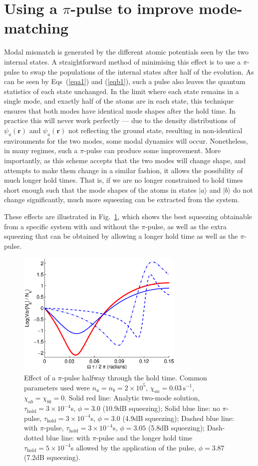 \documentclass{iopart}
\begin{document}
\section{Using a $\pi$-pulse to improve mode-matching} \label{sec:pipulse}
Modal mismatch is generated by the different atomic potentials seen by the two internal states.  A straightforward method of minimising this effect is to use a $\pi$-pulse to swap the populations of the internal states after half of the evolution. As can be seen by Eqs~(\ref{eqa1}) and (\ref{eqb1}), such a pulse also leaves the quantum statistics of each state unchanged. In the limit where each state remains in a single mode, and exactly half of the atoms are in each state, this technique ensures that both modes have identical mode shapes after the hold time. In practice this will never work perfectly --- due to the density distributions of $\psi_a(\mathbf{r})$ and $\psi_a(\mathbf{r})$ not reflecting the ground state, resulting in non-identical environments for the two modes, some modal dynamics will occur. Nonetheless, in many regimes, such a $\pi$-pulse can produce some improvement. More importantly, as this scheme accepts that the two modes will change shape, and attempts to make them change in a similar fashion, it allows the possibility of much longer hold times. That is, if we are no longer constrained to hold times short enough such that the mode shapes of the atoms in states $|a \rangle$ and $|b \rangle$ do not change significantly, much more squeezing can be extracted from the system.

These effects are illustrated in Fig.~\ref{piPulseFig}, which shows the best squeezing obtainable from a specific system with and without the $\pi$-pulse, as well as the extra squeezing that can be obtained by allowing a longer hold time as well as the $\pi$-pulse.
\begin{figure}
    \centering
    \includegraphics[width=8cm]{figures/pi_pulse.eps}
    \caption{Effect of a $\pi$-pulse halfway through the hold time. Common parameters used were $n_a = n_b =2 \times 10^5$, $\chi_{aa}=0.03\,\text{s}^{-1}$, $\chi_{ab}=\chi_{bb}=0$. Solid red line: Analytic two-mode solution, $\tau_{\mathrm{hold}}=3\times 10^{-4}$s, $\phi=3.0$ (10.9dB squeezing); Solid blue line: no $\pi$-pulse, $\tau_{\mathrm{hold}}=3\times 10^{-4}$s, $\phi=3.0$ (4.9dB squeezing);  Dashed blue line: with $\pi$-pulse, $\tau_{\mathrm{hold}}=3\times 10^{-4}$s, $\phi=3.05$ (5.8dB squeezing); Dash-dotted blue line: with $\pi$-pulse and the longer hold time $\tau_{\mathrm{hold}}=5\times 10^{-4}$s allowed by the application of the pulse, $\phi=3.87$ (7.2dB squeezing).}
    \label{piPulseFig}
\end{figure}
\end{document}
